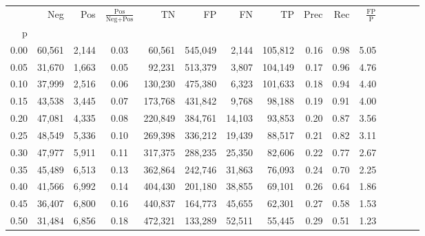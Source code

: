 \begin{tabular}{rrrcrrrrrrrrrrr}
\toprule
{} &     Neg &     Pos & $\frac{\text{Pos}}{\text{Neg}+\text{Pos}}$ &       TN &       FP &       FN &       TP &  Prec &   Rec & $\frac{\text{FP}}{\text{P}}$ \\
p    &         &         &                                            &          &          &          &          &       &       &                              \\
\midrule
0.00 &  60,561 &   2,144 &                                       0.03 &   60,561 &  545,049 &    2,144 &  105,812 &  0.16 &  0.98 &                         5.05 \\
0.05 &  31,670 &   1,663 &                                       0.05 &   92,231 &  513,379 &    3,807 &  104,149 &  0.17 &  0.96 &                         4.76 \\
0.10 &  37,999 &   2,516 &                                       0.06 &  130,230 &  475,380 &    6,323 &  101,633 &  0.18 &  0.94 &                         4.40 \\
0.15 &  43,538 &   3,445 &                                       0.07 &  173,768 &  431,842 &    9,768 &   98,188 &  0.19 &  0.91 &                         4.00 \\
0.20 &  47,081 &   4,335 &                                       0.08 &  220,849 &  384,761 &   14,103 &   93,853 &  0.20 &  0.87 &                         3.56 \\
0.25 &  48,549 &   5,336 &                                       0.10 &  269,398 &  336,212 &   19,439 &   88,517 &  0.21 &  0.82 &                         3.11 \\
0.30 &  47,977 &   5,911 &                                       0.11 &  317,375 &  288,235 &   25,350 &   82,606 &  0.22 &  0.77 &                         2.67 \\
0.35 &  45,489 &   6,513 &                                       0.13 &  362,864 &  242,746 &   31,863 &   76,093 &  0.24 &  0.70 &                         2.25 \\
0.40 &  41,566 &   6,992 &                                       0.14 &  404,430 &  201,180 &   38,855 &   69,101 &  0.26 &  0.64 &                         1.86 \\
0.45 &  36,407 &   6,800 &                                       0.16 &  440,837 &  164,773 &   45,655 &   62,301 &  0.27 &  0.58 &                         1.53 \\
0.50 &  31,484 &   6,856 &                                       0.18 &  472,321 &  133,289 &   52,511 &   55,445 &  0.29 &  0.51 &                         1.23 \\

\end{tabular}
